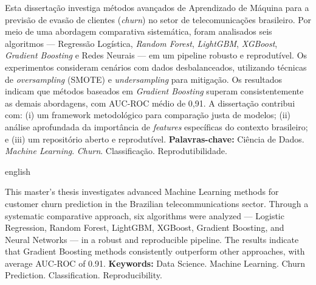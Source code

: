 \documentclass[
    12pt,
    oneside,
    a4paper,
    english,
    brazilian
    ]{abntex2}
\numberwithin{equation}{chapter}
\begin{document}
\pretextual
\maketitle
\newpage

\begin{resumo}
\noindent Esta dissertação investiga métodos avançados de Aprendizado de Máquina para a previsão de evasão de clientes (\textit{churn}) no setor de telecomunicações brasileiro. Por meio de uma abordagem comparativa sistemática, foram analisados seis algoritmos --- Regressão Logística, \textit{Random Forest}, \textit{LightGBM}, \textit{XGBoost}, \textit{Gradient Boosting} e Redes Neurais --- em um pipeline robusto e reprodutível. Os experimentos consideram cenários com dados desbalanceados, utilizando técnicas de \textit{oversampling} (SMOTE) e \textit{undersampling} para mitigação. Os resultados indicam que métodos baseados em \textit{Gradient Boosting} superam consistentemente as demais abordagens, com AUC-ROC médio de 0,91. A dissertação contribui com: (i) um framework metodológico para comparação justa de modelos; (ii) análise aprofundada da importância de \textit{features} específicas do contexto brasileiro; e (iii) um repositório aberto e reprodutível. 
\newline
\noindent \textbf{Palavras-chave:} Ciência de Dados. \textit{Machine Learning}. \textit{Churn}. Classificação. Reprodutibilidade.
\end{resumo}

\begin{otherlanguage*}{english}
\begin{resumo}[Abstract]
\noindent This master's thesis investigates advanced Machine Learning methods for customer churn prediction in the Brazilian telecommunications sector. Through a systematic comparative approach, six algorithms were analyzed --- Logistic Regression, Random Forest, LightGBM, XGBoost, Gradient Boosting, and Neural Networks --- in a robust and reproducible pipeline. The results indicate that Gradient Boosting methods consistently outperform other approaches, with average AUC-ROC of 0.91. 
\newline
\noindent \textbf{Keywords:} Data Science. Machine Learning. Churn Prediction. Classification. Reproducibility.
\end{resumo}
\end{otherlanguage*}
\newpage
\end{document}
